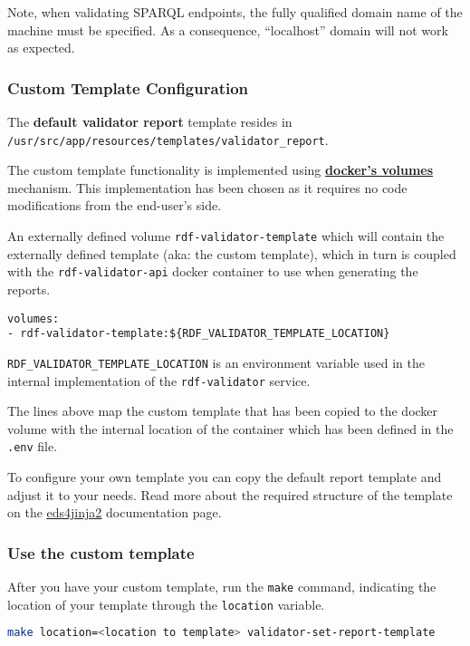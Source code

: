 	Note, when validating SPARQL endpoints, the fully qualified domain name of the machine must be specified. As a consequence, ``localhost'' domain will not work as expected.

	\subsubsection{Custom Template Configuration}
	The \textbf{default validator report} template resides in \\ \texttt{/usr/src/app/resources/templates/validator\_report}.

	The custom template functionality is implemented using \textbf{\href{https://docs.docker.com/storage/volumes/}{docker's volumes}} mechanism. This implementation has been chosen as it requires no code modifications from the end-user's side.
	
	An externally defined volume \texttt{rdf-validator-template} which will contain the externally defined template (aka: the custom template), which in turn is coupled with the \texttt{rdf-validator-api} docker container to use when generating the reports.

	\begin{lstlisting}[]
volumes:
- rdf-validator-template:${RDF_VALIDATOR_TEMPLATE_LOCATION}
	\end{lstlisting}

	\texttt{RDF\_VALIDATOR\_TEMPLATE\_LOCATION} is an environment variable used in the internal implementation of the \texttt{rdf-validator} service.

	The lines above map the custom template that has been copied to the docker volume with the internal location of the container which has been defined in the \texttt{.env} file.
	
	To configure your own template you can copy the default report template and adjust it to your needs. Read more about the required structure of the template on the \href{https://eds4jinja2.readthedocs.io/en/latest/#target-directory-layout}{\underline{eds4jinja2}} documentation page.
		
	\subsubsection{Use the custom template}
	After you have your custom template, run the \texttt{make} command, indicating the location of your template through the \texttt{location} variable.
	\begin{lstlisting}[language=bash]
make location=<location to template> validator-set-report-template
	\end{lstlisting}

